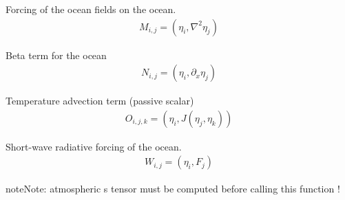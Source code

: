 \documentclass[letterpaper,10pt,english]{sphinxmanual}
\begin{document}
\begin{fulllineitems}
\begin{fulllineitems}
\end{fulllineitems}


\begin{fulllineitems}
\label{rstfiles/inprod_analytic:inprod_analytic.ocean_tensors.calculate_M}
Forcing of the ocean fields on the ocean.
\begin{equation*}
\begin{split}M_{i,j} = (\eta_i, \nabla^2 \eta_j)\end{split}
\end{equation*}
\end{fulllineitems}


\begin{fulllineitems}
\label{rstfiles/inprod_analytic:inprod_analytic.ocean_tensors.calculate_N}
Beta term for the ocean
\begin{equation*}
\begin{split}N_{i,j} = (\eta_i, \partial_x \eta_j)\end{split}
\end{equation*}
\end{fulllineitems}


\begin{fulllineitems}
\label{rstfiles/inprod_analytic:inprod_analytic.ocean_tensors.calculate_O}
Temperature advection term (passive scalar)
\begin{equation*}
\begin{split}O_{i,j,k} = (\eta_i, J(\eta_j, \eta_k))\end{split}
\end{equation*}
\end{fulllineitems}


\begin{fulllineitems}
\label{rstfiles/inprod_analytic:inprod_analytic.ocean_tensors.calculate_W}
Short-wave radiative forcing of the ocean.
\begin{equation*}
\begin{split}W_{i,j} = (\eta_i, F_j)\end{split}
\end{equation*}
\begin{notice}{note}{Note:}
atmospheric s tensor must be computed before calling
this function !
\end{notice}

\end{fulllineitems}


\end{fulllineitems}
\end{document}

